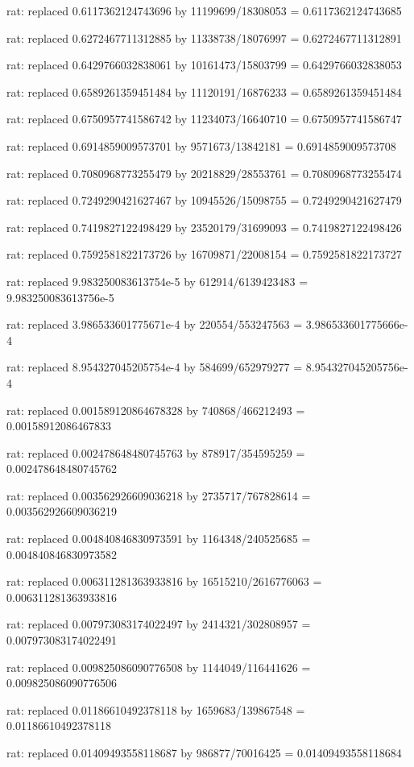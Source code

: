\documentclass[a4paper,10pt]{article}
\begin{document}
\begin{eulernotebook}
\begin{eulercomment}
\begin{eulercomment}
\begin{eulercomment}
\begin{eulercomment}
\begin{eulercomment}
\begin{eulercomment}
\begin{eulercomment}
\begin{eulercomment}
\begin{eulercomment}
\begin{eulercomment}
\begin{eulercomment}
\begin{eulercomment}
\begin{eulercomment}
\begin{eulercomment}
\begin{eulercomment}
\begin{eulercomment}
\begin{euleroutput}
  rat: replaced 0.6117362124743696 by 11199699/18308053 = 0.6117362124743685
  
  rat: replaced 0.6272467711312885 by 11338738/18076997 = 0.6272467711312891
  
  rat: replaced 0.6429766032838061 by 10161473/15803799 = 0.6429766032838053
  
  rat: replaced 0.6589261359451484 by 11120191/16876233 = 0.6589261359451484
  
  rat: replaced 0.6750957741586742 by 11234073/16640710 = 0.6750957741586747
  
  rat: replaced 0.6914859009573701 by 9571673/13842181 = 0.6914859009573708
  
  rat: replaced 0.7080968773255479 by 20218829/28553761 = 0.7080968773255474
  
  rat: replaced 0.7249290421627467 by 10945526/15098755 = 0.7249290421627479
  
  rat: replaced 0.7419827122498429 by 23520179/31699093 = 0.7419827122498426
  
  rat: replaced 0.7592581822173726 by 16709871/22008154 = 0.7592581822173727
  
  rat: replaced 9.983250083613754e-5 by 612914/6139423483 = 9.983250083613756e-5
  
  rat: replaced 3.986533601775671e-4 by 220554/553247563 = 3.986533601775666e-4
  
  rat: replaced 8.954327045205754e-4 by 584699/652979277 = 8.954327045205756e-4
  
  rat: replaced 0.001589120864678328 by 740868/466212493 = 0.00158912086467833
  
  rat: replaced 0.002478648480745763 by 878917/354595259 = 0.002478648480745762
  
  rat: replaced 0.003562926609036218 by 2735717/767828614 = 0.003562926609036219
  
  rat: replaced 0.004840846830973591 by 1164348/240525685 = 0.004840846830973582
  
  rat: replaced 0.006311281363933816 by 16515210/2616776063 = 0.006311281363933816
  
  rat: replaced 0.007973083174022497 by 2414321/302808957 = 0.007973083174022491
  
  rat: replaced 0.009825086090776508 by 1144049/116441626 = 0.009825086090776506
  
  rat: replaced 0.01186610492378118 by 1659683/139867548 = 0.01186610492378118
  
  rat: replaced 0.01409493558118687 by 986877/70016425 = 0.01409493558118684
  

\end{euleroutput}
\end{eulercomment}
\end{eulercomment}
\end{eulercomment}
\end{eulercomment}
\end{eulercomment}
\end{eulercomment}
\end{eulercomment}
\end{eulercomment}
\end{eulercomment}
\end{eulercomment}
\end{eulercomment}
\end{eulercomment}
\end{eulercomment}
\end{eulercomment}
\end{eulercomment}
\end{eulercomment}
\end{eulernotebook}
\end{document}
